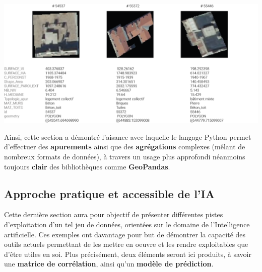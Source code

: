 \documentclass[
  11pt,
  french,
]{article}
\newcounter{customfigs}[section]
\newenvironment{customfigs}[1][] {
    \stepcounter{customfigs}
    Fig \arabic{section}. \arabic{customfigs} : }
\newcommand{\masked}{\vspace*{-\baselineskip}}
\begin{document}
\begin{tcolorbox}[title=\begin{customfigs} Aperçu du jeu de données agrégé final \end{customfigs}]

\begin{center}\includegraphics[width=1\linewidth]{__imgs/agg_final} \end{center}

\end{tcolorbox}

Ainsi, cette section a démontré l'aisance avec laquelle le langage
Python permet d'effectuer des \textbf{apurements} ainsi que des
\textbf{agrégations} complexes (mêlant de nombreux formats de données),
à travers un usage plus approfondi néanmoins toujours \textbf{clair} des
bibliothèques comme \textbf{GeoPandas}.

\newpage

\hypertarget{approche-pratique-et-accessible-de-lia}{%
\subsection{Approche pratique et accessible de
l'IA}\label{approche-pratique-et-accessible-de-lia}}

Cette dernière section aura pour objectif de présenter différentes
pistes d'exploitation d'un tel jeu de données, orientées sur le domaine
de l'Intelligence artificielle. Ces exemples ont davantage pour but de
démontrer la capacité des outils actuels permettant de les mettre en
oeuvre et les rendre exploitables que d'être utiles en soi. Plus
précisément, deux éléments seront ici produits, à savoir une
\textbf{matrice de corrélation}, ainsi qu'un \textbf{modèle de
prédiction}.

\newpage
\end{document}
